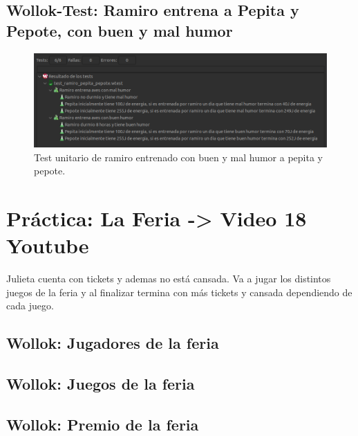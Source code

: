 \documentclass[11pt,a4paper]{article}
\begin{document}
\subsection{Wollok-Test: Ramiro entrena a Pepita y Pepote, con buen y mal humor}


\begin{figure}[H]
	\centering
	\includegraphics[scale=0.5]{figuras/test_ramiro_pepita_pepote.png}
    \caption{Test unitario de ramiro entrenado con buen y mal humor a pepita y pepote.}
    \label{fig:test ramiro entrena a pepita y pepote}
\end{figure}  

\section{Práctica: La Feria -> Video 18 Youtube}

Julieta cuenta con tickets y ademas no está cansada. Va a jugar los distintos juegos de la feria y al finalizar termina con más tickets y cansada dependiendo de cada juego.

\subsection{Wollok: Jugadores de la feria}


\subsection{Wollok: Juegos de la feria}


\subsection{Wollok: Premio de la feria}

\end{document}
